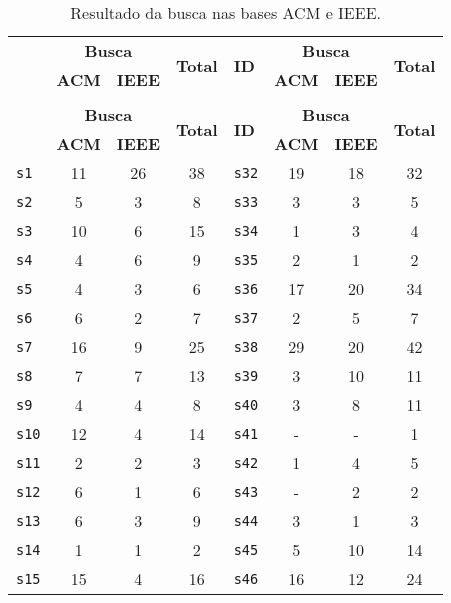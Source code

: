 \begin{longtable}{ l c c c | l c c c }
\caption{Resultado da busca nas bases ACM e IEEE.}
\label{search-table} \\
  \hline
  \hhline{ l c c c | l c c c |}
  \endfirsthead
  \hhline{ l c c c | l c c c |}
  \hline
   \multirow{2}{*}{\textbf{ID}} & \multicolumn{2}{c}{{\bf Busca}} & \multirow{2}{*}{\textbf{Total}} & \multirow{2}{*}{\textbf{ID}} & \multicolumn{2}{c}{{\bf Busca}} & \multirow{2}{*}{\textbf{Total}} \\
   & \textbf{ACM} & \textbf{IEEE} & & & \textbf{ACM} & \textbf{IEEE} & \\
  \hline
  \hhline{ l c c c | l c c c |}
  \endhead
  \hhline{----|----}
  \multicolumn{8}{c}{continua na próxima página} \\
  \hhline{----|----} \endfoot
  \hhline{----|----} \endlastfoot
   \multirow{2}{*}{\textbf{ID}} & \multicolumn{2}{c}{{\bf Busca}} & \multirow{2}{*}{\textbf{Total}} & \multirow{2}{*}{\textbf{ID}} & \multicolumn{2}{c}{{\bf Busca}} & \multirow{2}{*}{\textbf{Total}} \\
   & \textbf{ACM} & \textbf{IEEE} & & & \textbf{ACM} & \textbf{IEEE} & \\
  \hline
\texttt{s1} & 11 & 26 & 38 & \texttt{s32} & 19 & 18 & 32 \\
\texttt{s2} & 5 & 3 & 8 & \texttt{s33} & 3 & 3 & 5 \\
\texttt{s3} & 10 & 6 & 15 & \texttt{s34} & 1 & 3 & 4 \\
\texttt{s4} & 4 & 6 & 9 & \texttt{s35} & 2 & 1 & 2 \\
\texttt{s5} & 4 & 3 & 6 & \texttt{s36} & 17 & 20 & 34 \\
\texttt{s6} & 6 & 2 & 7 & \texttt{s37} & 2 & 5 & 7 \\
\texttt{s7} & 16 & 9 & 25 & \texttt{s38} & 29 & 20 & 42 \\
\texttt{s8} & 7 & 7 & 13 & \texttt{s39} & 3 & 10 & 11 \\
\texttt{s9} & 4 & 4 & 8 & \texttt{s40} & 3 & 8 & 11 \\
\texttt{s10} & 12 & 4 & 14 & \texttt{s41} & - & - & 1 \\
\texttt{s11} & 2 & 2 & 3 & \texttt{s42} & 1 & 4 & 5 \\
\texttt{s12} & 6 & 1 & 6 & \texttt{s43} & - & 2 & 2 \\
\texttt{s13} & 6 & 3 & 9 & \texttt{s44} & 3 & 1 & 3 \\
\texttt{s14} & 1 & 1 & 2 & \texttt{s45} & 5 & 10 & 14 \\
\texttt{s15} & 15 & 4 & 16 & \texttt{s46} & 16 & 12 & 24 \\

\end{longtable}
